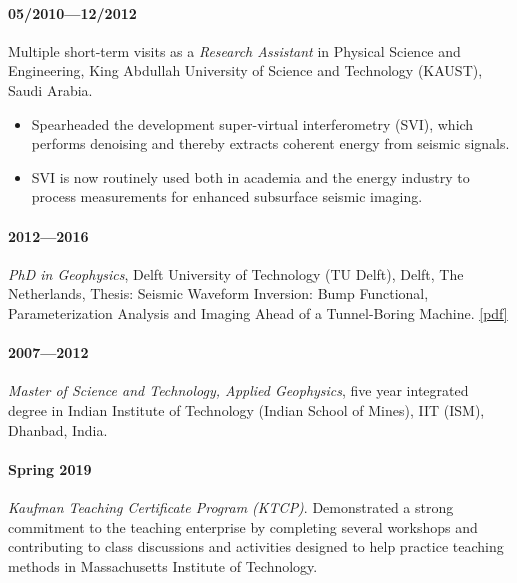 \documentclass[9pt]{developercv} %
\begin{document}
\paragraph{05/2010---12/2012}\label{section-2}

Multiple
short-term
visits as
a
\emph{Research
Assistant}
in
Physical
Science
and
Engineering,
King
Abdullah
University
of Science
and
Technology
(KAUST),
Saudi
Arabia.

\begin{itemize}
\item
  Spearheaded
  the
  development
  super-virtual
  interferometry
  (SVI),
  which
  performs
  denoising
  and
  thereby
  extracts
  coherent
  energy
  from
  seismic
  signals.
\item
  SVI is
  now
  routinely
  used
  both in
  academia
  and the
  energy
  industry
  to
  process
  measurements
  for
  enhanced
  subsurface
  seismic
  imaging.
\end{itemize}

\label{education}

\paragraph{2012---2016}\label{section-3}

\emph{PhD
in
Geophysics},
Delft
University
of
Technology
(TU
Delft),
Delft, The
Netherlands,
Thesis:
Seismic
Waveform
Inversion:
Bump
Functional,
Parameterization
Analysis
and
Imaging
Ahead of a
Tunnel-Boring
Machine.
\href{https://repository.tudelft.nl/islandora/object/uuid:8d59fd51-cbac-408d-a3e0-6a15891c2695/datastream/OBJ/download}{{[}pdf{]}}

\paragraph{2007---2012}\label{section-4}

\emph{Master
of Science
and
Technology,
Applied
Geophysics},
five year
integrated
degree in
Indian
Institute
of
Technology
(Indian
School of
Mines),
IIT (ISM),
Dhanbad,
India.

\label{teaching-experience-and-certification}

\paragraph{Spring
2019}\label{spring-2019}

\emph{Kaufman
Teaching
Certificate
Program
(KTCP)}.
Demonstrated
a strong
commitment
to the
teaching
enterprise
by
completing
several
workshops
and
contributing
to class
discussions
and
activities
designed
to help
practice
teaching
methods in
Massachusetts
Institute
of
Technology.
\end{document}
